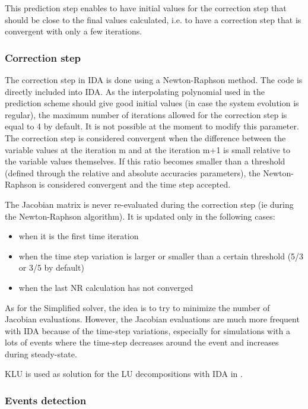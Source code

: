 \documentclass[a4paper, 12pt]{report}
\begin{document}
This prediction step enables to have initial values for the correction step that should be close to the final values calculated, i.e. to have a correction step that is convergent with only a few iterations.

\subsubsection{Correction step}

The correction step in IDA is done using a Newton-Raphson method. The code is directly included into IDA.
As the interpolating polynomial used in the prediction scheme should give good initial values (in case the system evolution is regular), the maximum number of iterations allowed for the correction step is equal to 4 by default. It is not possible at the moment to modify this parameter.
The correction step is considered convergent when the difference between the variable values at the iteration m and at the iteration m+1 is small relative to the variable values themselves. If this ratio becomes smaller than a threshold (defined through the relative and absolute accuracies parameters), the Newton-Raphson is considered convergent and the time step accepted.

The Jacobian matrix is never re-evaluated during the correction step (ie during the Newton-Raphson algorithm). It is updated only in the following cases:
\begin{itemize}
\item when it is the first time iteration
\item when the time step variation is larger or smaller than a certain threshold (5/3 or 3/5 by default)
\item when the last \ac{NR} calculation has not converged
\end{itemize}
As for the Simplified solver, the idea is to try to minimize the number of Jacobian evaluations. However, the Jacobian evaluations are much more frequent with IDA because of the time-step variations, especially for simulations with a lots of events where the time-step decreases around the event and increases during steady-state.

KLU is used as solution for the LU decompositions with \ac{IDA} in \Dynawo.

\subsubsection{Events detection}
\end{document}
